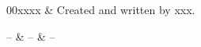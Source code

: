 %
%
 \label{sec:xxx}


%
%
\starthistory
  00xxxx & Created and written by xxx.\\
\stophistory


%
%
%
\startsymbols
  -- & -- & -- \\
 \label{symtable:wfuns}     
\stopsymbols



%
%




 \label{sec:xxx:xxx}




